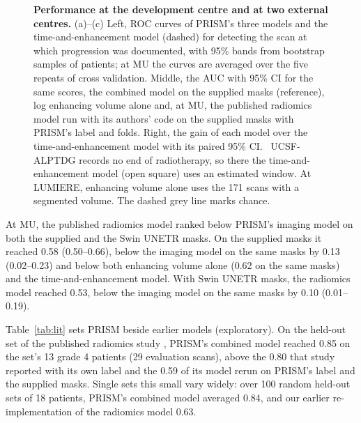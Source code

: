 \documentclass[largeformat]{interact} %
\begin{document}
\begin{figure}[!htbp]
\centering
{}
\caption{\textbf{Performance at the development centre and at two external centres.} (a)--(c) Left, ROC curves of
PRISM's three models and the time-and-enhancement model (dashed) for detecting the scan at which progression was
documented, with 95\% bands from bootstrap samples of patients; at MU the curves are averaged over the five repeats of
cross validation. Middle, the AUC with 95\% CI for the same scores, the combined model on the supplied masks
(reference), log enhancing volume alone and, at MU, the published radiomics model run with its authors' code on
the supplied masks with PRISM's label and folds. Right, the gain of each model over the time-and-enhancement model with its paired 95\% CI.
\textdagger\ UCSF-ALPTDG records no end of radiotherapy, so there the time-and-enhancement model (open square) uses an
estimated window. At LUMIERE, enhancing volume alone uses the 171 scans with a segmented volume. The dashed grey line marks chance.}
\label{fig:2}
\end{figure}

At MU, the published radiomics model ranked below PRISM's imaging model on both the supplied and the Swin UNETR
masks. On the supplied masks it reached 0.58 (0.50--0.66), below the imaging model on the same masks by 0.13
(0.02--0.23) and below both enhancing volume alone (0.62 on the same masks) and the time-and-enhancement model. With Swin UNETR masks, the radiomics model reached 0.53, below the imaging model on the same masks by
0.10 (0.01--0.19).

Table~\ref{tab:lit} sets PRISM beside earlier models (exploratory). On the held-out set of the published radiomics study \citep{christodoulou2026}, PRISM's combined model reached 0.85
on the set's 13 grade 4 patients (29 evaluation scans), above the 0.80 that study reported with its own label and the
0.59 of its model rerun on PRISM's label and the supplied masks. Single sets this small vary widely: over 100 random
held-out sets of 18 patients, PRISM's combined model averaged 0.84, and our earlier re-implementation of the radiomics
model 0.63.
\end{document}
